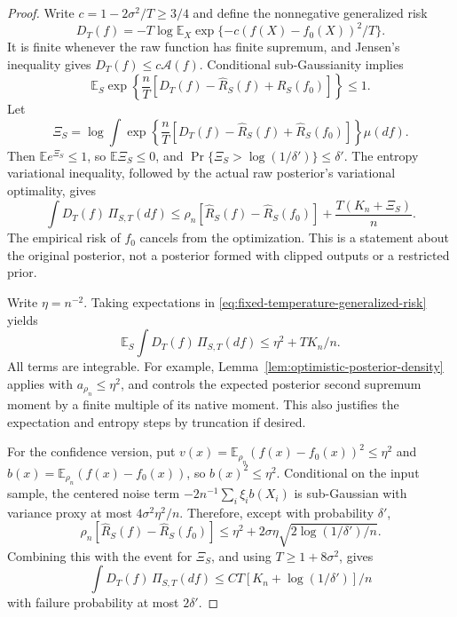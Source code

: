\begin{proof}
Write $c=1-2\sigma^2/T\ge3/4$ and define the nonnegative generalized risk
\[
 D_T(f)=-T\log\mathbb E_X
             \exp\{-c(f(X)-f_0(X))^2/T\}.
\]
It is finite whenever the raw function has finite supremum, and Jensen's inequality gives $D_T(f)\le c\mathcal A(f)$. Conditional sub-Gaussianity implies
\[
 \mathbb E_S\exp\left\{\frac nT
       [D_T(f)-\widehat R_S(f)+\widehat R_S(f_0)]\right\}\le1.
\]
Let
\[
 \Xi_S=\log\int\exp\left\{\frac nT
       [D_T(f)-\widehat R_S(f)+\widehat R_S(f_0)]\right\}\mu(df).
\]
Then $\mathbb E e^{\Xi_S}\le1$, so $\mathbb E\Xi_S\le0$, and
$\Pr\{\Xi_S>\log(1/\delta')\}\le\delta'$. The entropy variational inequality, followed by the actual raw posterior's variational optimality, gives
\begin{equation}
 \int D_T(f)\,\Pi_{S,T}(df)
 \le\rho_n[\widehat R_S(f)-\widehat R_S(f_0)]
                          +\frac{T(K_n+\Xi_S)}n.
 \label{eq:fixed-temperature-generalized-risk}
\end{equation}
The empirical risk of $f_0$ cancels from the optimization. This is a statement about the original posterior, not a posterior formed with clipped outputs or a restricted prior.

Write $\eta=n^{-2}$. Taking expectations in
\eqref{eq:fixed-temperature-generalized-risk} yields
\begin{equation}
 \mathbb E_S\int D_T(f)\,\Pi_{S,T}(df)
                   \le\eta^2+TK_n/n.
 \label{eq:fixed-temperature-expected-generalized-risk}
\end{equation}
All terms are integrable. For example, Lemma~\ref{lem:optimistic-posterior-density} applies with $a_{\rho_n}\le\eta^2$, and controls the expected posterior second supremum moment by a finite multiple of its native moment. This also justifies the expectation and entropy steps by truncation if desired.

For the confidence version, put
$v(x)=\mathbb E_{\rho_n}(f(x)-f_0(x))^2\le\eta^2$
and $b(x)=\mathbb E_{\rho_n}(f(x)-f_0(x))$, so $b(x)^2\le\eta^2$. Conditional on the input sample, the centered noise term
$-2n^{-1}\sum_i\xi_i b(X_i)$ is sub-Gaussian with variance proxy at most $4\sigma^2\eta^2/n$. Therefore, except with probability $\delta'$,
\[
 \rho_n[\widehat R_S(f)-\widehat R_S(f_0)]
 \le\eta^2+2\sigma\eta\sqrt{2\log(1/\delta')/n}.
\]
Combining this with the event for $\Xi_S$, and using $T\ge1+8\sigma^2$, gives
\begin{equation}
 \int D_T(f)\,\Pi_{S,T}(df)
       \le CT[K_n+\log(1/\delta')]/n
 \label{eq:fixed-temperature-hp-generalized-risk}
\end{equation}
with failure probability at most $2\delta'$.


\end{proof}
